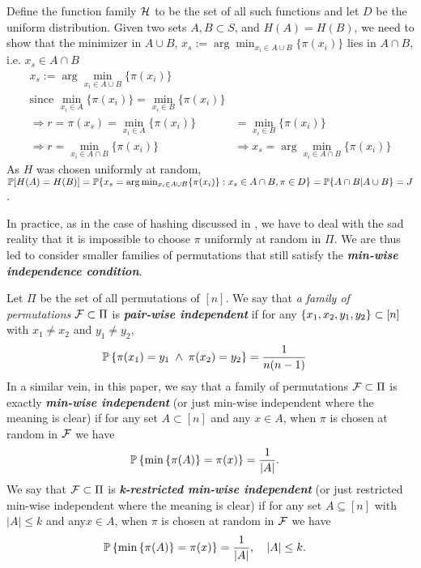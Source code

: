 \documentclass[11pt]{article}
\begin{document}
Define the function family ${\mathcal H}$ to be the set of all such functions and let $D$ be the uniform distribution. Given two sets $A, B \subset S$, and  $H(A)=H(B)$, we need to show that the minimizer in $A\cup B$, $x_s:= \arg\min_{x_i  \in A \cup B}\{\pi(x_i)\}$ lies in $A\cap B$, i.e. $x_s \in A\cap B$
\begin{align*}
x_s:= \arg\min_{x_i  \in A \cup B}\{\pi(x_i)\} & \\
\text{since } \min_{x_i  \in A}\{\pi(x_i)\} = \min_{x_i  \in B}\{\pi(x_i)\} \\
\Rightarrow r = \pi(x_s)= \min_{x_i  \in A}\{\pi(x_i)\} & = \min_{x_i  \in B}\{\pi(x_i)\}\\
\Rightarrow r =  \min_{x_i  \in A \cap B}\{\pi(x_i)\} &\Rightarrow x_s = \arg\min_{x_i  \in A \cap B}\{\pi(x_i)\}
\end{align*} As $H$ was chosen uniformly at random, ${\mathbb P}[H(A) = H(B)] = {\mathbb P}\{x_s=  \arg\min_{x_i  \in A \cup B}\{\pi(x_i)\}: x_s \in A\cap B, \pi \in D\} = {\mathbb P}\{A\cap B | A\cup B\} = J$. 

In practice, as in the case of hashing discussed in \citep{broder2000min}, we have to deal with the sad reality that it is impossible to choose $\pi$ uniformly at random in $\Pi$. We are thus led to consider smaller families of permutations that still satisfy the \emph{\textbf{min-wise independence condition}}.

Let $\Pi$ be the set of all permutations of $[n]$. We say that \emph{a family of permutations} ${\mathcal F} \subset \Pi$ is \emph{\textbf{pair-wise independent}} if for any $\left\{x_1, x_2, y_1, y_2\right\} \subset [n]$ with $x_1 \neq x_2$ and $y_1 \neq  y_2$,
\begin{align*}
{\mathbb P}\left\{\pi(x_1) = y_1 \;\land\;  \pi(x_2) = y_2\right\} &= \frac{1}{n(n-1)}
\end{align*} In a similar vein, in this paper, we say that a family of permutations ${\mathcal F} \subset \Pi$ is exactly \emph{\textbf{min-wise independent}} (or just min-wise independent where the meaning is clear) if for any set $A \subset [n]$ and any $x \in A$, when $\pi$ is chosen at random in ${\mathcal F}$ we have
\begin{align*}
{\mathbb P}\left\{\min\left\{\pi(A)\right\} = \pi(x)\right\} &= \frac{1}{\left\lvert A \right\rvert}.
\end{align*} We say that ${\mathcal F} \subset \Pi$ is \emph{\textbf{k-restricted min-wise independent}} (or just restricted min-wise independent where the meaning is clear) if for any set $A \subseteq [n]$ with $|A| \le k$ and any$x \in A$, when $\pi$ is chosen at random in ${\mathcal F}$ we have
\begin{align*}
{\mathbb P}\left\{\min\left\{\pi(A)\right\} = \pi(x)\right\} &= \frac{1}{\left\lvert A \right\rvert}, \quad |A| \le k.
\end{align*} 
\end{document}
